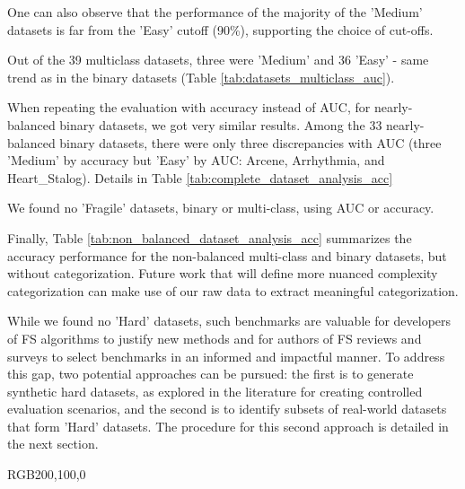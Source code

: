 \documentclass[preprint,12pt,authoryear]{elsarticle}
\begin{document}
One can also observe that the performance of the majority of the 'Medium' datasets is far from the 'Easy' cutoff (90\%), supporting the choice of cut-offs.

Out of the 39 multiclass datasets, three were 'Medium' and 36 'Easy' - same trend as in the binary datasets (Table \ref{tab:datasets_multiclass_auc}).

When repeating the evaluation with accuracy instead of AUC, for nearly-balanced binary datasets, we got very similar results. Among the 33 nearly-balanced binary datasets, there were only three discrepancies with AUC (three 'Medium' by accuracy but 'Easy' by AUC: Arcene, Arrhythmia, and Heart\_Stalog). Details in Table \ref{tab:complete_dataset_analysis_acc}

We found no 'Fragile' datasets, binary or multi-class, using AUC or accuracy.


Finally, Table \ref{tab:non_balanced_dataset_analysis_acc} summarizes the accuracy performance for the non-balanced multi-class and binary datasets, but without categorization. Future work that will define more nuanced complexity categorization can make use of our raw data to extract meaningful categorization. 

\vspace{2mm}
While we found no 'Hard' datasets, such benchmarks are valuable for developers of FS algorithms to justify new methods and for authors of FS reviews and surveys to select benchmarks in an informed and impactful manner. To address this gap, two potential approaches can be pursued: the first is to generate synthetic hard datasets, as explored in the literature for creating controlled evaluation scenarios, and the second is to identify subsets of real-world datasets that form 'Hard' datasets. The procedure for this second approach is detailed in the next section.




\definecolor{MedCol} {RGB}{200,100,0}   %
\end{document}
